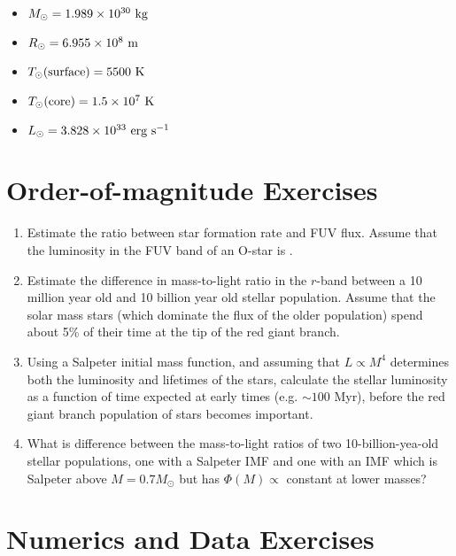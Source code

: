 \begin{itemize}
\item $M_{\odot} = 1.989 \times 10^{30} {\rm ~kg} $
\item $R_{\odot} = 6.955 \times 10^{8} {\rm ~m} $
\item $T_{\odot}{\rm (surface)} = 5500 {\rm ~K} $
\item $T_{\odot}{\rm (core)} = 1.5 \times 10^7 {\rm ~K} $
\item $L_{\odot} = 3.828 \times 10^{33} {\rm ~erg} {\rm ~s}^{-1}$
\end{itemize}

\section{Order-of-magnitude Exercises}

\begin{enumerate} 
\item Estimate the ratio between star formation rate and FUV flux.
    Assume that the luminosity in the FUV band of an O-star
    is .
\item Estimate the difference in mass-to-light ratio in the $r$-band
    between a 10 million year old and 10 billion year old stellar
    population. Assume that the solar mass stars (which dominate the
    flux of the older population) spend about 5\% of their time at the
    tip of the red giant branch.
\item Using a Salpeter initial mass function, and assuming that
$L\propto M^4$ determines both the luminosity and lifetimes of the
stars, calculate the stellar luminosity as a function of time expected
at early times (e.g. $\sim 100$ Myr), before the red giant branch
population of stars becomes important.
\item What is difference between the mass-to-light ratios of two
10-billion-yea-old stellar populations, one with a Salpeter IMF and
one with an IMF which is Salpeter above $M=0.7M_\odot$ but has
$\Phi(M) \propto$ constant at lower masses?
\end{enumerate} 

%

\section{Numerics and Data Exercises}

